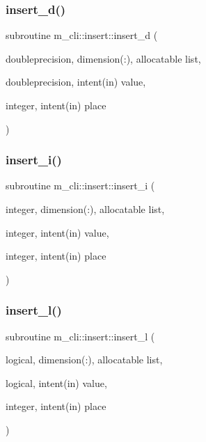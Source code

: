 \mbox{\label{interfacem__cli_1_1insert_a754e4845aabebdb9c34a928f49cdaa59}} 
\subsubsection{\texorpdfstring{insert\+\_\+d()}{insert\_d()}}
{\footnotesize\ttfamily subroutine m\+\_\+cli\+::insert\+::insert\+\_\+d (\begin{DoxyParamCaption}\item[{doubleprecision, dimension(\+:), allocatable}]{list,  }\item[{doubleprecision, intent(in)}]{value,  }\item[{integer, intent(in)}]{place }\end{DoxyParamCaption})\hspace{0.3cm}{\ttfamily [private]}}

\mbox{\label{interfacem__cli_1_1insert_adc369899b95770d6a3e40b22945014d0}} 
\subsubsection{\texorpdfstring{insert\+\_\+i()}{insert\_i()}}
{\footnotesize\ttfamily subroutine m\+\_\+cli\+::insert\+::insert\+\_\+i (\begin{DoxyParamCaption}\item[{integer, dimension(\+:), allocatable}]{list,  }\item[{integer, intent(in)}]{value,  }\item[{integer, intent(in)}]{place }\end{DoxyParamCaption})\hspace{0.3cm}{\ttfamily [private]}}

\mbox{\label{interfacem__cli_1_1insert_a058a7eb2f5a375bd7a27cabcba64c717}} 
\subsubsection{\texorpdfstring{insert\+\_\+l()}{insert\_l()}}
{\footnotesize\ttfamily subroutine m\+\_\+cli\+::insert\+::insert\+\_\+l (\begin{DoxyParamCaption}\item[{logical, dimension(\+:), allocatable}]{list,  }\item[{logical, intent(in)}]{value,  }\item[{integer, intent(in)}]{place }\end{DoxyParamCaption})\hspace{0.3cm}{\ttfamily [private]}}

